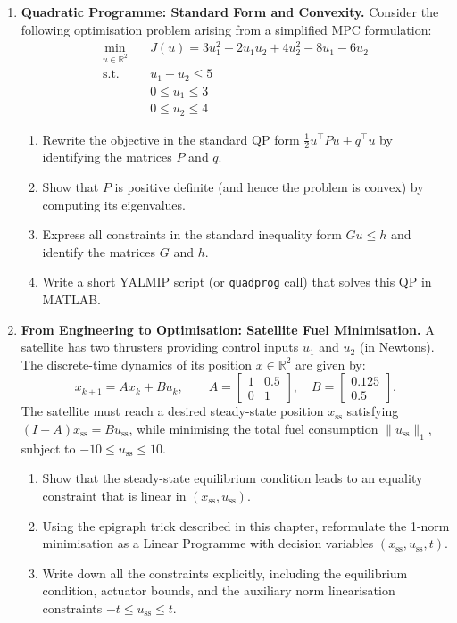 \begin{enumerate}
	\item \textbf{Quadratic Programme: Standard Form and Convexity.}
	Consider the following optimisation problem arising from a simplified MPC formulation:
	\begin{equation*}
		\begin{aligned}
			\min_{u \in \mathbb{R}^2} \quad & J(u) = 3u_1^2 + 2u_1 u_2 + 4u_2^2 - 8u_1 - 6u_2 \\
			\text{s.t.} \quad & u_1 + u_2 \leq 5 \\
			& 0 \leq u_1 \leq 3 \\
			& 0 \leq u_2 \leq 4
		\end{aligned}
	\end{equation*}
	\begin{enumerate}
		\item Rewrite the objective in the standard QP form $\frac{1}{2} u^\top P u + q^\top u$ by identifying the matrices $P$ and $q$.
		\item Show that $P$ is positive definite (and hence the problem is convex) by computing its eigenvalues.
		\item Express all constraints in the standard inequality form $Gu \leq h$ and identify the matrices $G$ and $h$.
		\item Write a short YALMIP script (or \texttt{quadprog} call) that solves this QP in MATLAB.
	\end{enumerate}

	\item \textbf{From Engineering to Optimisation: Satellite Fuel Minimisation.}
	A satellite has two thrusters providing control inputs $u_1$ and $u_2$ (in Newtons). The discrete-time dynamics of its position $x \in \mathbb{R}^2$ are given by:
	\[
	x_{k+1} = A x_k + B u_k, \qquad A = \begin{bmatrix} 1 & 0.5 \\ 0 & 1 \end{bmatrix}, \quad B = \begin{bmatrix} 0.125 \\ 0.5 \end{bmatrix}.
	\]
	The satellite must reach a desired steady-state position $x_{\mathrm{ss}}$ satisfying $(I-A)x_{\mathrm{ss}} = B u_{\mathrm{ss}}$, while minimising the total fuel consumption $\|u_{\mathrm{ss}}\|_1$, subject to $-10 \leq u_{\mathrm{ss}} \leq 10$.
	\begin{enumerate}
		\item Show that the steady-state equilibrium condition leads to an equality constraint that is linear in $(x_{\mathrm{ss}}, u_{\mathrm{ss}})$.
		\item Using the epigraph trick described in this chapter, reformulate the 1-norm minimisation as a Linear Programme with decision variables $(x_{\mathrm{ss}}, u_{\mathrm{ss}}, t)$.
		\item Write down all the constraints explicitly, including the equilibrium condition, actuator bounds, and the auxiliary norm linearisation constraints $-t \leq u_{\mathrm{ss}} \leq t$.
	\end{enumerate}
\end{enumerate}
